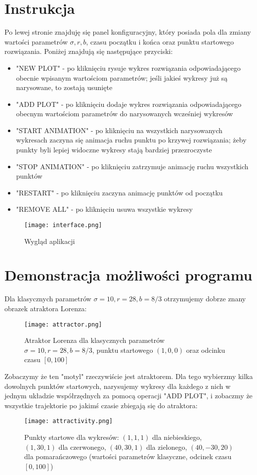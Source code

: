 \documentclass[12pt]{report}
\begin{document}
	\section{Instrukcja}
	\par Po lewej stronie znajduję się panel konfiguracyjny, który posiada pola dla zmiany wartości parametrów $\sigma, r, b$, czasu początku i końca oraz punktu startowego rozwiązania. Poniżej znajdują się następujące przyciski:
	\begin{itemize}
		\item "NEW PLOT" - po kliknięciu rysuje wykres rozwiązania odpowiadającego obecnie wpisanym wartościom parametrów; jeśli jakieś wykresy już są narysowane, to zostają usunięte
		\item "ADD PLOT" - po kliknięciu dodaje wykres rozwiązania odpowiadającego obecnym wartościom parametrów do narysowanych wcześniej wykresów
		\item "START ANIMATION" - po kliknięciu na wszystkich narysowanych wykresach zaczyna się animacja ruchu punktu po krzywej rozwiązania; żeby punkty byli lepiej widoczne wykresy stają bardziej przezroczyste
		\item "STOP ANIMATION" - po kliknięciu zatrzymuje animację ruchu wszystkich punktów
		\item "RESTART" - po kliknięciu zaczyna animację punktów od początku 
		\item "REMOVE ALL" - po kliknięciu usuwa wszystkie wykresy
	\end{itemize}
	\begin{figure}[H]
		\centering
		\texttt{[image: interface.png]}
		\caption{Wygląd aplikacji}
		\label{fig:interface}
	\end{figure}

	\section{Demonstracja możliwości programu}
	\par Dla klasycznych parametrów $\sigma = 10, r = 28, b = 8/3$ otrzymujemy dobrze znany obrazek atraktora Lorenza:
	\begin{figure}[H]
		\centering
		\texttt{[image: attractor.png]}
		\caption{Atraktor Lorenza dla klasycznych parametrów $\sigma = 10, r = 28, b = 8/3$, punktu startowego $(1, 0, 0)$ oraz odcinku czasu $[0, 100]$}
		\label{fig:attractor}
	\end{figure}
	Zobaczymy że ten "motyl" rzeczywiście jest atraktorem. Dla tego wybierzmy kilka dowolnych punktów startowych, narysujemy wykresy dla każdego z nich w jednym układzie współrzędnych za pomocą operacji "ADD PLOT", i zobaczmy że wszystkie trajektorie po jakimś czasie zbiegają się do atraktora:
	\begin{figure}[H]
		\centering
		\texttt{[image: attractivity.png]}
		\caption{Punkty startowe dla wykresów: $(1, 1, 1)$ dla niebieskiego, $(1, 30, 1)$ dla czerwonego, $(40, 30, 1)$ dla zielonego, $(40, -30, 20)$ dla pomarańczowego (wartości parametrów klasyczne, odcinek czasu $[0, 100]$)}
		\label{fig:attractivity}
	\end{figure}
\end{document}
